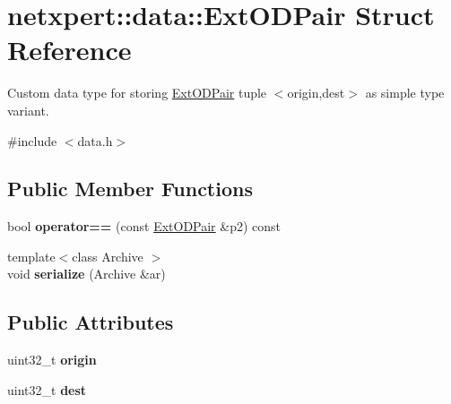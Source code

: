 \hypertarget{structnetxpert_1_1data_1_1ExtODPair}{}\section{netxpert\+:\+:data\+:\+:Ext\+O\+D\+Pair Struct Reference}
\label{structnetxpert_1_1data_1_1ExtODPair}


Custom data type for storing \hyperlink{structnetxpert_1_1data_1_1ExtODPair}{Ext\+O\+D\+Pair} tuple $<$origin,dest$>$ as simple type variant.  




{\ttfamily \#include $<$data.\+h$>$}

\subsection*{Public Member Functions}
\begin{DoxyCompactItemize}
\item 
bool {\bfseries operator==} (const \hyperlink{structnetxpert_1_1data_1_1ExtODPair}{Ext\+O\+D\+Pair} \&p2) const \hypertarget{structnetxpert_1_1data_1_1ExtODPair_a8209b9b7fe51bf55a73ca4fde3120627}{}\label{structnetxpert_1_1data_1_1ExtODPair_a8209b9b7fe51bf55a73ca4fde3120627}

\item 
{\footnotesize template$<$class Archive $>$ }\\void {\bfseries serialize} (Archive \&ar)\hypertarget{structnetxpert_1_1data_1_1ExtODPair_aed8b2cd85d2ddcb2e3c76512e8eeae21}{}\label{structnetxpert_1_1data_1_1ExtODPair_aed8b2cd85d2ddcb2e3c76512e8eeae21}

\end{DoxyCompactItemize}
\subsection*{Public Attributes}
\begin{DoxyCompactItemize}
\item 
uint32\+\_\+t {\bfseries origin}\hypertarget{structnetxpert_1_1data_1_1ExtODPair_a35f843db5fc7705ab12959727bc528b4}{}\label{structnetxpert_1_1data_1_1ExtODPair_a35f843db5fc7705ab12959727bc528b4}

\item 
uint32\+\_\+t {\bfseries dest}\hypertarget{structnetxpert_1_1data_1_1ExtODPair_ae38c7608bba39a2d32ef1a5ea6e4c187}{}\label{structnetxpert_1_1data_1_1ExtODPair_ae38c7608bba39a2d32ef1a5ea6e4c187}

\end{DoxyCompactItemize}



